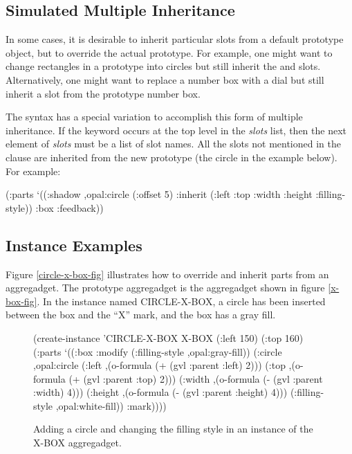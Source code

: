 \subsection{Simulated Multiple Inheritance}
In some cases, it is desirable to inherit particular slots from
a default prototype object, but to override the actual prototype.
For example, one might want to change rectangles in a prototype
into circles but still inherit the  and  slots.
Alternatively, one might want to replace a number box with a dial
but still inherit a  slot from the prototype number box.

The  syntax has a special variation to accomplish this form
of multiple inheritance.  If the keyword  occurs at the
top level in the {\it slots} list, then the next element of {\it slots}
must be a list of slot names.  All the slots not mentioned in the
 clause are inherited from the new prototype (the circle in
the example below).  For example:
\begin{programexample}
(:parts `((:shadow ,opal:circle
	    (:offset 5)
	    :inherit (:left :top :width :height :filling-style))
	  :box
	  :feedback))
\end{programexample}


\subsection{Instance Examples}
Figure \ref{circle-x-box-fig} illustrates how to override and inherit
parts from an aggregadget.  The prototype aggregadget is the 
aggregadget shown in figure \ref{x-box-fig}.  In the instance named
CIRCLE-X-BOX, a circle has been inserted between the box and the ``X''
mark, and the box has a gray fill.

\begin{figure}
\begin{center}
\end{center}
\begin{programexample}

(create-instance 'CIRCLE-X-BOX X-BOX
   (:left 150)
   (:top 160)
   (:parts
    `((:box :modify (:filling-style ,opal:gray-fill))
      (:circle ,opal:circle
	       (:left ,(o-formula (+ (gvl :parent :left) 2)))
	       (:top ,(o-formula (+ (gvl :parent :top) 2)))
	       (:width ,(o-formula (- (gvl :parent :width) 4)))
	       (:height ,(o-formula (- (gvl :parent :height) 4)))
	       (:filling-style ,opal:white-fill))
      :mark))))
\end{programexample}
\caption{Adding a circle and changing the filling style in an instance
of the X-BOX aggregadget.}
\end{figure}

